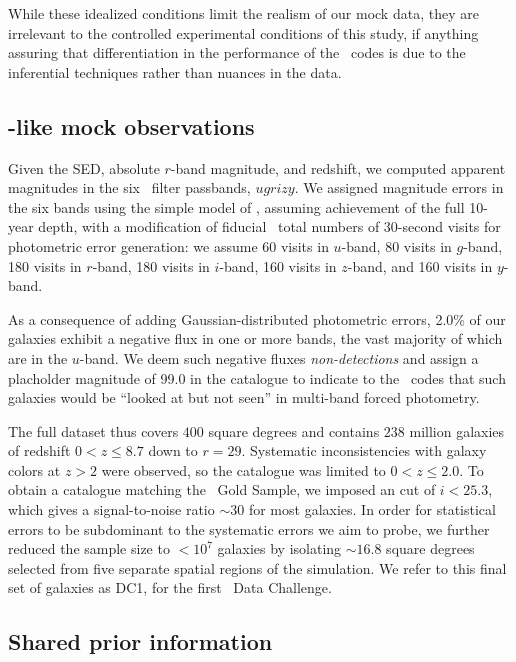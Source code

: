 While these idealized conditions limit the realism of our mock data, they are irrelevant to the controlled experimental conditions of this study, if anything assuring that differentiation in the performance of the \pzpdf\ codes is due to the inferential techniques rather than nuances in the data.

\subsection{\lsst-like mock observations}

Given the SED, absolute $r$-band magnitude, and redshift, we computed apparent magnitudes in the six \lsst\ filter passbands, $ugrizy$.
We assigned magnitude errors in the six bands using the simple model of \citet{Ivezic:08}, assuming achievement of the full 10-year depth, with a modification of fiducial \lsst\ total numbers of 30-second visits for photometric error generation: we assume 60 visits in $u$-band, 80 visits in $g$-band, 180 visits in $r$-band, 180 visits in $i$-band, 160 visits in $z$-band, and 160 visits in $y$-band.

As a consequence of adding Gaussian-distributed photometric errors, 2.0\% of our galaxies exhibit a negative flux in one or more bands, the vast majority of which are in the $u$-band.
We deem such negative fluxes \textit{non-detections} and assign a placholder magnitude of 99.0 in the catalogue to indicate to the \pzpdf\ codes that such galaxies would be ``looked at but not seen'' in multi-band forced photometry.

The full dataset thus covers $400$ square degrees and contains $238$ million galaxies of redshift $0 < z \leq 8.7$ down to $r = 29$.
Systematic inconsistencies with galaxy colors at $z > 2$ were observed, so the catalogue was limited to $0 < z \leq 2.0$.
To obtain a catalogue matching the \lsst\ Gold Sample, we imposed an cut of $i < 25.3$, which gives a signal-to-noise ratio $\sim 30$ for most galaxies.
In order for statistical errors to be subdominant to the systematic errors we aim to probe, we further reduced the sample size to $<10^{7}$ galaxies by isolating $\sim 16.8$ square degrees selected from five separate spatial regions of the simulation.
We refer to this final set of galaxies as DC1, for the first \desc\ Data Challenge.

\subsection{Shared prior information}

